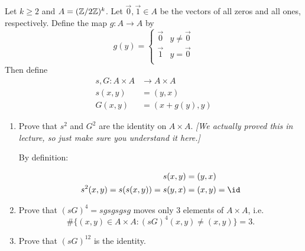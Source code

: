 \begin{problem}
  Let $k \geq 2$ and $A=(\mathbb{Z}/2\mathbb{Z})^k$.  Let $\vec{0}, \vec{1} \in A$ be
  the vectors of all zeros and all ones, respectively.  Define the map
  $g : A \to A$ by
\[
g(y) = 
\begin{cases}
\vec{0} & y \neq \vec{0} \\
\vec{1} & y = \vec{0} \\
\end{cases}
\]
Then define
\begin{align*} 
s,G: A \times A &\to A \times A \\
s(x,y) &= (y,x) \\
G(x,y) &= (x + g(y),y)
\end{align*}
\begin{enumerate}\renewcommand{\itemsep}{3mm}
\item Prove that $s^2$ and $G^2$ are the identity on $A \times A$.
\emph{[We actually proved this in lecture, so just make sure you
  understand it here.]}

\begin{Answer}

By definition:

\begin{align*}
  s(x, y) &= (y, x) \\
  s^2(x, y) = s(s(x, y)) = s(y, x) &= (x, y) = \id \\

\end{align*}

\end{Answer}


\item Prove that $(sG)^4=sgsgsgsg$ moves only $3$ elements of $A \times A$, i.e. 
\[ \#\{(x,y) \in A \times A:(sG)^4(x,y) \neq (x,y)\}=3. \]
\item Prove that $(sG)^{12}$ is the identity.
\end{enumerate}
\end{problem}
